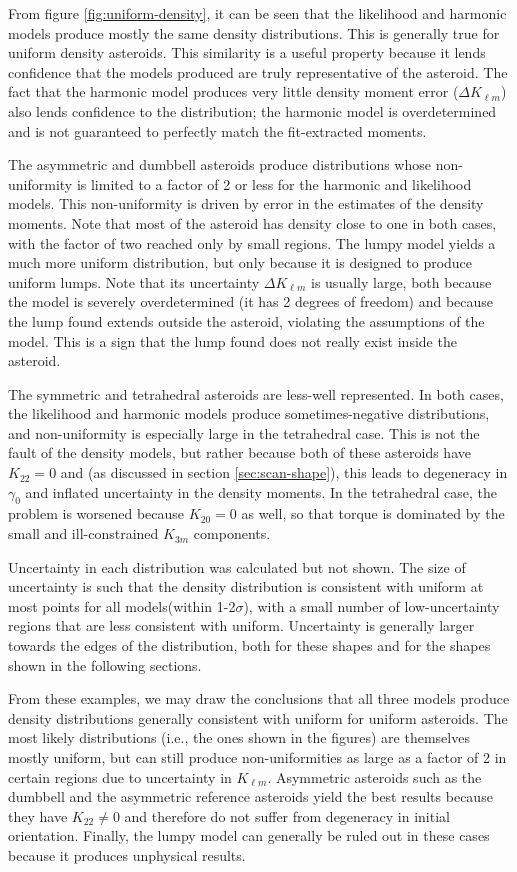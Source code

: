 \documentclass[fleqn,usenatbib]{mnras}
\begin{document}
From figure \ref{fig:uniform-density}, it can be seen that the likelihood and harmonic models produce mostly the same density distributions. This is generally true for uniform density asteroids. This similarity is a useful property because it lends confidence that the models produced are truly representative of the asteroid. The fact that the harmonic model produces very little density moment error ($\Delta K_{\ell m}$) also lends confidence to the distribution; the harmonic model is overdetermined and is not guaranteed to perfectly match the fit-extracted moments.

The asymmetric and dumbbell asteroids produce distributions whose non-uniformity is limited to a factor of 2 or less for the harmonic and likelihood models. This non-uniformity is driven by error in the estimates of the density moments. Note that most of the asteroid has density close to one in both cases, with the factor of two reached only by small regions. The lumpy model yields a much more uniform distribution, but only because it is designed to produce uniform lumps. Note that its uncertainty $\Delta K_{\ell m}$ is usually large, both because the model is severely overdetermined (it has 2 degrees of freedom) and because the lump found extends outside the asteroid, violating the assumptions of the model. This is a sign that the lump found does not really exist inside the asteroid.

The symmetric and tetrahedral asteroids are less-well represented. In both cases, the likelihood and harmonic models produce sometimes-negative distributions, and non-uniformity is especially large in the tetrahedral case. This is not the fault of the density models, but rather because both of these asteroids have $K_{22} = 0$ and (as discussed in section \ref{sec:scan-shape}), this leads to degeneracy in $\gamma_0$ and inflated uncertainty in the density moments. In the tetrahedral case, the problem is worsened because $K_{20}=0$ as well, so that torque is dominated by the small and ill-constrained $K_{3m}$ components.

Uncertainty in each distribution was calculated but not shown. The size of uncertainty is such that the density distribution is consistent with uniform at most points for all models(within 1-2$\sigma$), with a small number of low-uncertainty regions that are less consistent with uniform. Uncertainty is generally larger towards the edges of the distribution, both for these shapes and for the shapes shown in the following sections.

From these examples, we may draw the conclusions that all three models produce density distributions generally consistent with uniform for uniform asteroids. The most likely distributions (i.e., the ones shown in the figures) are themselves mostly uniform, but can still produce non-uniformities as large as a factor of 2 in certain regions due to uncertainty in $K_{\ell m}$. Asymmetric asteroids such as the dumbbell and the asymmetric reference asteroids yield the best results because they have $K_{22} \neq 0$ and therefore do not suffer from degeneracy in initial orientation. Finally, the lumpy model can generally be ruled out in these cases because it produces unphysical results.
\end{document}
